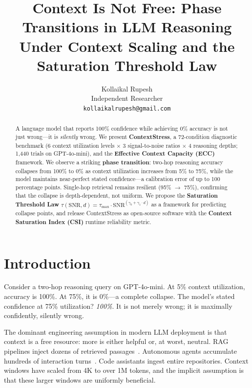 \documentclass{article}
\title{Context Is Not Free: Phase Transitions in LLM Reasoning\\Under Context Scaling and the Saturation Threshold Law}
\author{
  Kollaikal Rupesh\\
  Independent Researcher\\
  \texttt{kollaikalrupesh@gmail.com}
}
\begin{document}
\maketitle

\begin{abstract}
A language model that reports 100\% confidence while achieving 0\% accuracy is not just wrong---it is \emph{silently} wrong.
We present \textbf{ContextStress}, a 72-condition diagnostic benchmark ($6$ context utilization levels $\times$ $3$ signal-to-noise ratios $\times$ $4$ reasoning depths; 1{,}440 trials on GPT-4o-mini), and the \textbf{Effective Context Capacity (ECC)} framework.
We observe a striking \textbf{phase transition}: two-hop reasoning accuracy collapses from 100\% to 0\% as context utilization increases from 5\% to 75\%, while the model maintains near-perfect stated confidence---a calibration error of up to 100 percentage points.
Single-hop retrieval remains resilient (95\% $\to$ 75\%), confirming that the collapse is depth-dependent, not uniform.
We propose the \textbf{Saturation Threshold Law} $\tau(\mathrm{SNR}, d) = \tau_{\max} \cdot \mathrm{SNR}^{(\gamma_0 + \gamma_1 \cdot d)}$ as a framework for predicting collapse points, and release ContextStress as open-source software with the \textbf{Context Saturation Index (CSI)} runtime reliability metric.
\end{abstract}

\section{Introduction}
\label{sec:introduction}

Consider a two-hop reasoning query on GPT-4o-mini.
At 5\% context utilization, accuracy is 100\%.
At 75\%, it is 0\%---a complete collapse.
The model's stated confidence at 75\% utilization? \emph{100\%}.
It is not merely wrong; it is maximally confidently, silently wrong.

The dominant engineering assumption in modern LLM deployment is that context is a free resource: more is either helpful or, at worst, neutral.
RAG pipelines inject dozens of retrieved passages~\citep{lewis2020rag,gao2024rag}.
Autonomous agents accumulate hundreds of interaction turns~\citep{yao2023react,wang2024agents}.
Code assistants ingest entire repositories.
Context windows have scaled from 4K to over 1M tokens, and the implicit assumption is that these larger windows are uniformly beneficial.
\end{document}
